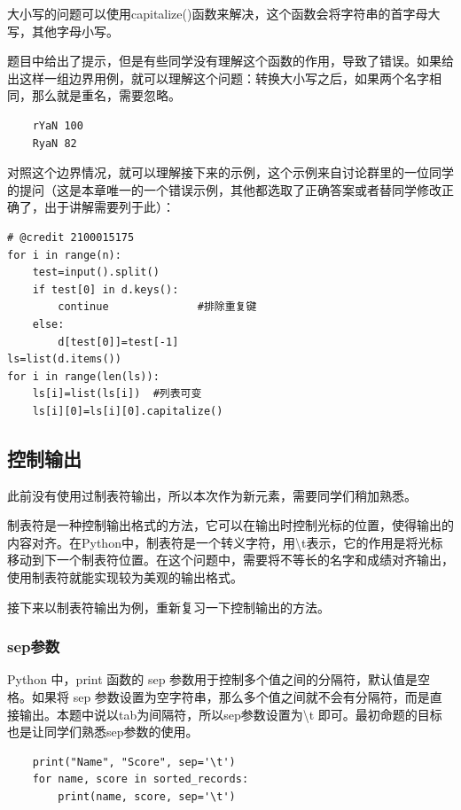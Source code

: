 \documentclass{article}
\begin{document}
大小写的问题可以使用capitalize()函数来解决，这个函数会将字符串的首字母大写，其他字母小写。

题目中给出了提示，但是有些同学没有理解这个函数的作用，导致了错误。如果给出这样一组边界用例，就可以理解这个问题：转换大小写之后，如果两个名字相同，那么就是重名，需要忽略。

\begin{lstlisting}
    rYaN 100
    RyaN 82
\end{lstlisting}

对照这个边界情况，就可以理解接下来的示例，这个示例来自讨论群里的一位同学的提问（这是本章唯一的一个错误示例，其他都选取了正确答案或者替同学修改正确了，出于讲解需要列于此）：
\begin{lstlisting}
# @credit 2100015175
for i in range(n):
    test=input().split()
    if test[0] in d.keys():
        continue              #排除重复键
    else:
        d[test[0]]=test[-1]   
ls=list(d.items())
for i in range(len(ls)):
    ls[i]=list(ls[i])  #列表可变
    ls[i][0]=ls[i][0].capitalize()
\end{lstlisting}


\subsection{控制输出}

此前没有使用过制表符输出，所以本次作为新元素，需要同学们稍加熟悉。

制表符是一种控制输出格式的方法，它可以在输出时控制光标的位置，使得输出的内容对齐。在Python中，制表符是一个转义字符，用\textbackslash t表示，它的作用是将光标移动到下一个制表符位置。在这个问题中，需要将不等长的名字和成绩对齐输出，使用制表符就能实现较为美观的输出格式。

接下来以制表符输出为例，重新复习一下控制输出的方法。

\subsubsection{sep参数}

Python 中，print 函数的 sep 参数用于控制多个值之间的分隔符，默认值是空格。如果将 sep 参数设置为空字符串，那么多个值之间就不会有分隔符，而是直接输出。本题中说以tab为间隔符，所以sep参数设置为\textbackslash t 即可。最初命题的目标也是让同学们熟悉sep参数的使用。

\begin{lstlisting}
    print("Name", "Score", sep='\t')
    for name, score in sorted_records:
        print(name, score, sep='\t')
\end{lstlisting}
\end{document}
